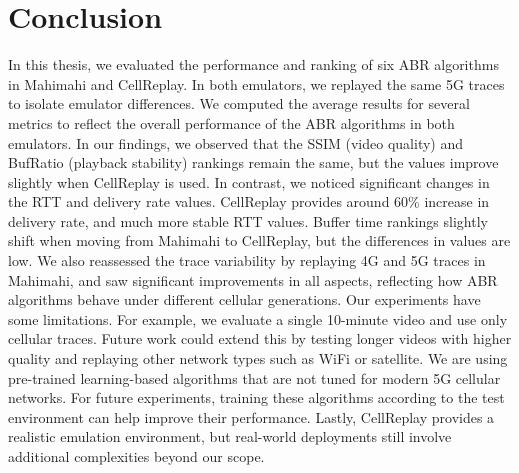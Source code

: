\section{Conclusion}\label{s:conclusion}

In this thesis, we evaluated the performance and ranking of six ABR algorithms in Mahimahi and CellReplay. In both emulators, we replayed the same 5G traces to isolate emulator differences. We computed the average results for several metrics to reflect the overall performance of the ABR algorithms in both emulators. In our findings, we observed that the SSIM (video quality) and BufRatio (playback stability) rankings remain the same, but the values improve slightly when CellReplay is used. In contrast, we noticed significant changes in the RTT and delivery rate values. CellReplay provides around 60\% increase in delivery rate, and much more stable RTT values. Buffer time rankings slightly shift when moving from Mahimahi to CellReplay, but the differences in values are low. We also reassessed the trace variability by replaying 4G and 5G traces in Mahimahi, and saw significant improvements in all aspects, reflecting how ABR algorithms behave under different cellular generations. Our experiments have some limitations. For example, we evaluate a single 10-minute video and use only cellular traces. Future work could extend this by testing longer videos with higher quality and replaying other network types such as WiFi or satellite. We are using pre-trained learning-based algorithms that are not tuned for modern 5G cellular networks. For future experiments, training these algorithms according to the test environment can help improve their performance. Lastly, CellReplay provides a realistic emulation environment, but real-world deployments still involve additional complexities beyond our scope.

